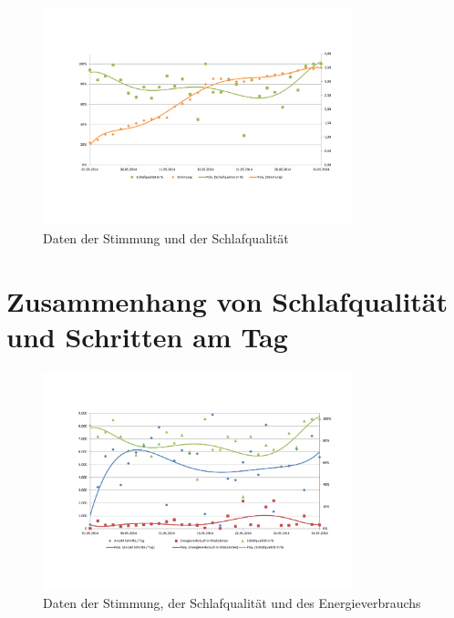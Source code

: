 \begin{figure}[H]
\centering
        \includegraphics[angle=270,width=0.8\textwidth]{images/Analyse/Sleep-Mood} 
        \caption[Daten der Stimmung und der Schlafqualität]{Daten der Stimmung und der Schlafqualität}
        \label{fig:ZusammenhangVonStimmungUndSchlafqualität}
\end{figure}

\section{Zusammenhang von Schlafqualität und Schritten am Tag}
\label{ch:AnalyseUndEvaluierung:sec:KorrelationVonSchlafqualitätUndSchrittenAmTag}

\begin{figure}[H]
\centering
        \includegraphics[angle=270,width=0.8\textwidth]{images/Analyse/Sleep-Steps-kcal} 
        \caption[Daten der Stimmung, der Schlafqualität und des Energieverbrauchs]{Daten der Stimmung, der Schlafqualität und des Energieverbrauchs}
        \label{fig:ZusammenhangVonSchlafqualitätSchrittenUndEnergieverbrauchAmTag}
\end{figure}

